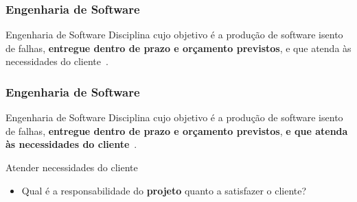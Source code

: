 \begin{frame}[parent={ie:agenda}, hasnext=false, hasprev=false]
	\frametitle{Engenharia de Software}

	\begin{block:concept}{Engenharia de Software}
		Disciplina cujo objetivo é a produção de software isento de falhas, \textbf{entregue
		dentro de prazo e orçamento previstos}, e que atenda às necessidades do
		cliente~\cite[p.~4]{Schach:2008}.
	\end{block:concept}
\end{frame}


\begin{frame}[hasnext=false, hasprev=true]
	\frametitle{Engenharia de Software}

	\begin{block:concept}{Engenharia de Software}
		Disciplina cujo objetivo é a produção de software isento de falhas, \textbf{entregue
		dentro de prazo e orçamento previstos}, \textbf{e que atenda às necessidades do
		cliente}~\cite[p.~4]{Schach:2008}.
	\end{block:concept}
	
	\begin{block:fact}{Atender necessidades do cliente}
		\begin{itemize}
			\item Qual é a responsabilidade do \textbf{projeto} quanto a satisfazer o cliente?
		\end{itemize}
	\end{block:fact}
	
\end{frame}
